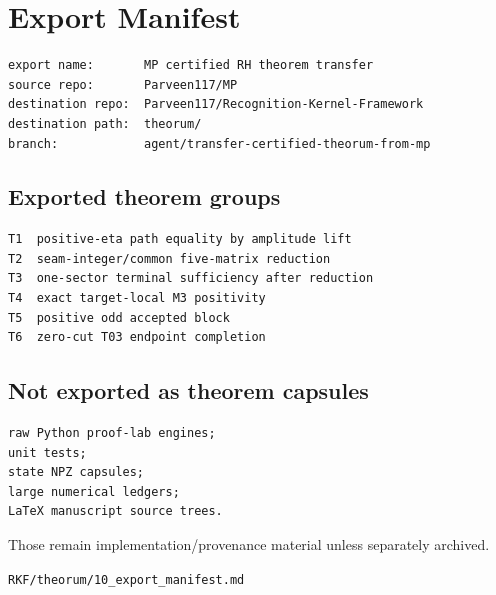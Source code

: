 \hypertarget{export-manifest}{%
\chapter{Export Manifest}\label{export-manifest}}

\begin{verbatim}
export name:       MP certified RH theorem transfer
source repo:       Parveen117/MP
destination repo:  Parveen117/Recognition-Kernel-Framework
destination path:  theorum/
branch:            agent/transfer-certified-theorum-from-mp
\end{verbatim}

\hypertarget{exported-theorem-groups}{%
\section{Exported theorem groups}\label{exported-theorem-groups}}

\begin{verbatim}
T1  positive-eta path equality by amplitude lift
T2  seam-integer/common five-matrix reduction
T3  one-sector terminal sufficiency after reduction
T4  exact target-local M3 positivity
T5  positive odd accepted block
T6  zero-cut T03 endpoint completion
\end{verbatim}

\hypertarget{not-exported-as-theorem-capsules}{%
\section{Not exported as theorem capsules}\label{not-exported-as-theorem-capsules}}

\begin{verbatim}
raw Python proof-lab engines;
unit tests;
state NPZ capsules;
large numerical ledgers;
LaTeX manuscript source trees.
\end{verbatim}

Those remain implementation/provenance material unless separately archived.

\begin{flushright}\small\texttt{RKF/theorum/10\_export\_manifest.md}\end{flushright}

